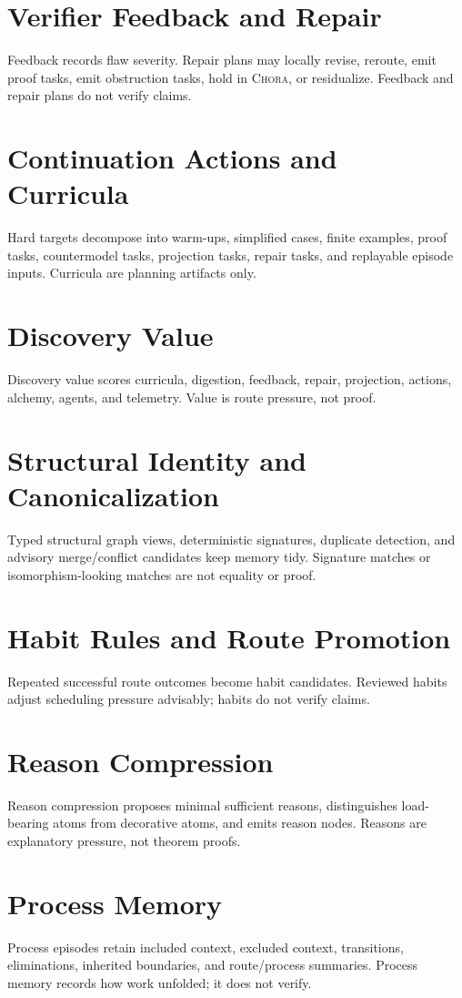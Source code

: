 \documentclass[11pt,a4paper]{article}
\newcommand{\Chora}{\textsc{Chora}}
\begin{document}
\section{Verifier Feedback and Repair}
Feedback records flaw severity. Repair plans may locally revise, reroute, emit proof tasks, emit obstruction tasks, hold in \Chora{}, or residualize. Feedback and repair plans do not verify claims.

\section{Continuation Actions and Curricula}
Hard targets decompose into warm-ups, simplified cases, finite examples, proof tasks, countermodel tasks, projection tasks, repair tasks, and replayable episode inputs. Curricula are planning artifacts only.

\section{Discovery Value}
Discovery value scores curricula, digestion, feedback, repair, projection, actions, alchemy, agents, and telemetry. Value is route pressure, not proof.

\section{Structural Identity and Canonicalization}
Typed structural graph views, deterministic signatures, duplicate detection, and advisory merge/conflict candidates keep memory tidy. Signature matches or isomorphism-looking matches are not equality or proof.

\section{Habit Rules and Route Promotion}
Repeated successful route outcomes become habit candidates. Reviewed habits adjust scheduling pressure advisably; habits do not verify claims.

\section{Reason Compression}
Reason compression proposes minimal sufficient reasons, distinguishes load-bearing atoms from decorative atoms, and emits reason nodes. Reasons are explanatory pressure, not theorem proofs.

\section{Process Memory}
Process episodes retain included context, excluded context, transitions, eliminations, inherited boundaries, and route/process summaries. Process memory records how work unfolded; it does not verify.
\end{document}
